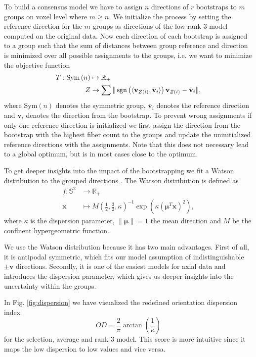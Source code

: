 To build a consensus model we have to assign $n$ directions of $r$ bootstraps to $m$ groups on voxel
level where $m \geq n$. We initialize the process by setting the reference
direction for the $m$ groups as directions of
the low-rank $3$ model computed on the original data. Now each
direction of each bootstrap is assigned to a group such that the sum of
distances between group
reference and direction is minimized over all possible assignments to the
groups, i.e. we want to minimize the objective function 
\begin{align}
	T : \text{Sym} \left( n \right) & \mapsto \mathbb{R}_+ \nonumber \\
	Z & \rightarrow \sum \| \operatorname*{sgn} \left( \langle \mathbf{v}_{Z\left( i
	\right)}, \bar{\mathbf{v}}_i \rangle \right) \mathbf{v}_{Z\left( i
	\right)} - \bar{\mathbf{v}}_i\| ,  
\end{align} 
where $\text{Sym}\left( n \right)$ denotes the symmetric group, 
$\bar{\mathbf{v}}_i$ denotes
the reference direction and $\mathbf{v}_i$ denotes the direction from the
bootstrap. To prevent wrong assignments if only one reference
direction is initialized we first assign the direction from the bootstrap with
the  highest fiber count to the
groups and update the uninitialized reference directions with the assignments.
Note that this does not necessary lead to a global optimum, but is in most cases
close to the optimum. 

To get deeper insights into the impact of the bootstrapping we fit a Watson
distribution to the grouped directions \cite{jupp_mardia_1999}. The Watson distribution is defined as  
\begin{align*}
	f : \mathbb{S}^2 & \longrightarrow  \mathbb{R}_+ \\
	\mathbf{x} & \longmapsto  M \left( \frac{1}{2}, \frac{3}{2} , \kappa
	\right)^{-1} \exp \left(  \kappa
	\left( \mathbf{\mu}^T \mathbf{x} \right)^2 
	\right) 	,  
\end{align*}
where $\kappa$ is the dispersion parameter, $\| \mathbf{\mu} \| = 1$ the
mean direction and $M$ be the confluent hypergeometric function. 

We use the Watson distribution because it has two main advantages. First of all, it is antipodal symmetric,
which fits our model assumption of indistinguishable $\pm \mathbf{v}$
directions. Secondly, it is one of the easiest models for axial data and
introduces the dispersion parameter, which gives  us deeper insights into the
uncertainty within the groups. 

In Fig. \ref{fig:dispersion} we have visualized the redefined orientation dispersion index
\cite{dispersionParameter}  
\[ OD = \frac{2}{\pi} \arctan \left( \frac{1}{\kappa} \right) \] 
for the selection, average and rank 3 model. This score is more intuitive since
it maps the low dispersion to low values and vice versa. 

